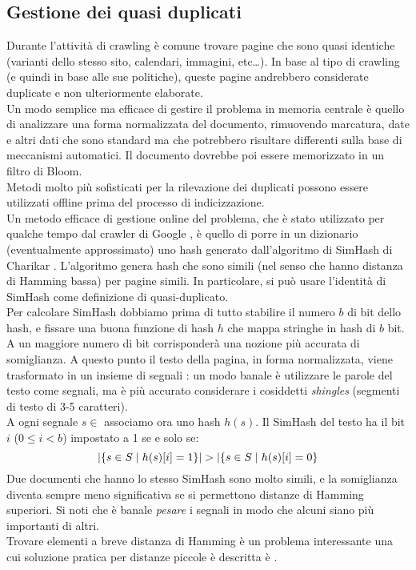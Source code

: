 \subsection{Gestione dei quasi duplicati}
Durante l'attività di crawling è comune trovare pagine che sono quasi identiche (varianti dello stesso sito, calendari, immagini, etc\dots). In base al tipo di crawling (e quindi in base alle sue politiche), queste pagine andrebbero considerate duplicate e non ulteriormente elaborate.\\
Un modo semplice ma efficace di gestire il problema in memoria centrale è quello di analizzare una forma normalizzata del documento, rimuovendo marcatura, date e altri dati che sono standard ma che potrebbero risultare differenti sulla base di meccanismi automatici. Il documento dovrebbe poi essere memorizzato in un filtro di Bloom.\\
Metodi molto più sofisticati per la rilevazione dei duplicati possono essere utilizzati offline prima del processo di indicizzazione.\\
Un metodo efficace di gestione online del problema, che è stato utilizzato per qualche tempo dal crawler di Google \cite{google}, è quello di porre in un dizionario (eventualmente approssimato) uno hash generato dall'algoritmo di SimHash di Charikar \cite{SimHash}. L'algoritmo genera hash che sono simili (nel senso che hanno distanza di Hamming bassa) per pagine simili. In particolare, si può usare l'identità di SimHash come definizione di quasi-duplicato.\\
Per calcolare SimHash dobbiamo prima di tutto stabilire il numero $b$ di bit dello hash, e fissare una buona funzione di hash $h$ che mappa stringhe in hash di $b$ bit. A un maggiore numero di bit corrisponderà una nozione più accurata di somiglianza. A questo punto il testo della pagina, in forma normalizzata, viene trasformato in un insieme di segnali : un modo banale è utilizzare le parole del testo come segnali, ma è più accurato considerare i cosiddetti \textit{shingles} (segmenti di testo di 3-5 caratteri).\\
A ogni segnale $s \in$  associamo ora uno hash $h(s)$. Il SimHash del testo ha il bit $i$ ($0 \leq i < b$) impostato a 1 se e solo se:
\begin{equation*}
    |\{s \in S \hspace{1mm}|\hspace{1mm} h(s)[i] = 1\}| > |\{s \in S \hspace{1mm}|\hspace{1mm} h(s)[i] = 0\}
\end{equation*}
Due documenti che hanno lo stesso SimHash sono molto simili, e la somiglianza diventa sempre meno significativa se si permettono distanze di Hamming superiori. Si noti che è banale \textit{pesare} i segnali in modo che alcuni siano più importanti di altri.\\
Trovare elementi a breve distanza di Hamming è un problema interessante una cui soluzione pratica per distanze piccole è descritta è \cite{google}.\\
